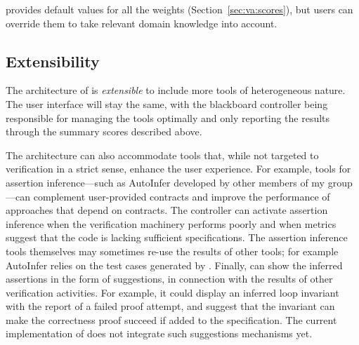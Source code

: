 \EVE provides default values for all the weights (Section~\ref{sec:va:scores}), but users can override them to take relevant domain knowledge into account.





\subsection{Extensibility}

The architecture of \EVE is \emph{extensible} to include more tools of heterogeneous nature.
The user interface will stay the same, with the blackboard controller being responsible for managing the tools optimally and only reporting the results through the summary scores described above.

The architecture can also accommodate tools that, while not targeted to verification in a strict sense, enhance the user experience.
For example, tools for assertion inference---such as AutoInfer \cite{WEI11} developed by other members of my group---can complement user-provided contracts and improve the performance of approaches that depend on contracts.
The controller can activate assertion inference when the verification machinery performs poorly and when metrics suggest that the code is lacking sufficient specifications.
The assertion inference tools themselves may sometimes re-use the results of other tools; for example AutoInfer relies on the test cases generated by \AutoTest.
Finally, \EVE can show the inferred assertions in the form of suggestions, in connection with the results of other verification activities.
For example, it could display an inferred loop invariant with the report of a failed proof attempt, and suggest that the invariant can make the correctness proof succeed if added to the specification.
The current implementation of \EVE does not integrate such suggestions mechanisms yet. %


